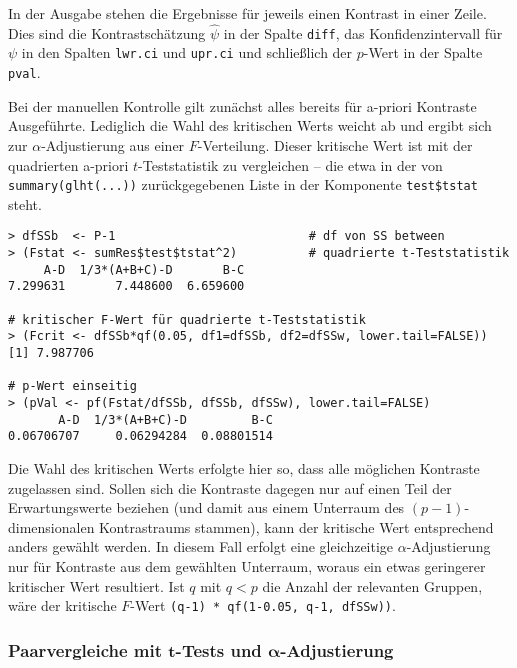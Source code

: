 In der Ausgabe stehen die Ergebnisse für jeweils einen Kontrast in einer Zeile. Dies sind die Kontrastschätzung $\hat{\psi}$ in der Spalte \lstinline!diff!, das Konfidenzintervall für $\psi$ in den Spalten \lstinline!lwr.ci! und \lstinline!upr.ci! und schließlich der $p$-Wert in der Spalte \lstinline!pval!.

Bei der manuellen Kontrolle gilt zunächst alles bereits für a-priori Kontraste Ausgeführte. Lediglich die Wahl des kritischen Werts weicht ab und ergibt sich zur $\alpha$-Adjustierung aus einer $F$-Verteilung. Dieser kritische Wert ist mit der quadrierten a-priori $t$-Teststatistik zu vergleichen -- die etwa in der von \lstinline!summary(glht(...))! zurückgegebenen Liste in der Komponente \lstinline!test$tstat! steht.
\begin{lstlisting}
> dfSSb  <- P-1                           # df von SS between
> (Fstat <- sumRes$test$tstat^2)          # quadrierte t-Teststatistik
     A-D  1/3*(A+B+C)-D       B-C
7.299631       7.448600  6.659600

# kritischer F-Wert für quadrierte t-Teststatistik
> (Fcrit <- dfSSb*qf(0.05, df1=dfSSb, df2=dfSSw, lower.tail=FALSE))
[1] 7.987706

# p-Wert einseitig
> (pVal <- pf(Fstat/dfSSb, dfSSb, dfSSw), lower.tail=FALSE)
       A-D  1/3*(A+B+C)-D         B-C
0.06706707     0.06294284  0.08801514
\end{lstlisting}

Die Wahl des kritischen Werts erfolgte hier so, dass alle möglichen Kontraste zugelassen sind. Sollen sich die Kontraste dagegen nur auf einen Teil der Erwartungswerte beziehen (und damit aus einem Unterraum des $(p-1)$-dimensionalen Kontrastraums stammen), kann der kritische Wert entsprechend anders gewählt werden. In diesem Fall erfolgt eine gleichzeitige $\alpha$-Adjustierung nur für Kontraste aus dem gewählten Unterraum, woraus ein etwas geringerer kritischer Wert resultiert. Ist $q$ mit $q < p$ die Anzahl der relevanten Gruppen, wäre der kritische $F$-Wert \lstinline!(q-1) * qf(1-0.05, q-1, dfSSw))!.

\subsubsection[{Paarvergleiche mit \texorpdfstring{$t$}{t}-Tests und \texorpdfstring{$\alpha$}{alpha}-Adjustierung}]{Paarvergleiche mit $\bm{t}$-Tests und $\bm{\alpha}$-Adjustierung}
\label{sec:pairwiseT}

